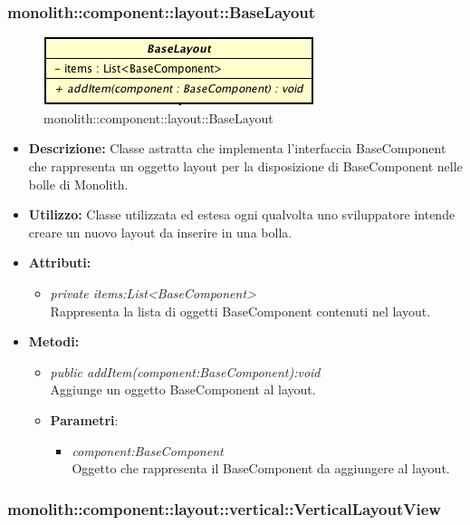\subsubsection{monolith::component::layout::BaseLayout}

\label{monolith::component::layout::BaseLayout}
\begin{figure}[ht]
	\centering
	\includegraphics[scale=0.5]{Sezioni/SottosezioniST/img/BaseLayout.png}
	\caption{monolith::component::layout::BaseLayout}
\end{figure}

\begin{itemize}
\item \textbf{Descrizione:} Classe astratta che implementa l'interfaccia BaseComponent che rappresenta un oggetto layout per la disposizione di BaseComponent nelle bolle di Monolith.
\item \textbf{Utilizzo:} Classe utilizzata ed estesa ogni qualvolta uno sviluppatore intende creare un nuovo layout da inserire in una bolla.
\item \textbf{Attributi:}
\begin{itemize}
\item \textit{private items:List<BaseComponent>}\\
Rappresenta la lista di oggetti BaseComponent contenuti nel layout.
\end{itemize}
\item \textbf{Metodi:}
\begin{itemize}
\item \textit{public addItem(component:BaseComponent):void}\\
Aggiunge un oggetto BaseComponent al layout.
\item{\textbf{Parametri}: \begin{itemize}
\item \textit{component:BaseComponent}\\
Oggetto che rappresenta il BaseComponent da aggiungere al layout.
\end{itemize}}
\end{itemize}
\end{itemize}

\subsubsection{monolith::component::layout::vertical::VerticalLayoutView}

